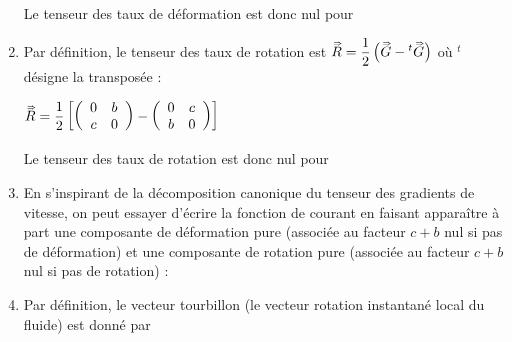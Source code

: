 \documentclass[10pt, a4paper]{article}
\begin{document}
\begin{enumerate}
\medskip
Le tenseur des taux de déformation est donc nul pour 

\item
Par définition, le tenseur des taux de rotation est $\accentset{\Rightarrow}{R} 
= \displaystyle \frac{1}{2} \left ( \accentset{\Rightarrow}{G} - {}^t \accentset{\Rightarrow}{G} \right )$
où ${}^t$ désigne la transposée :

\medskip
$
	\accentset{\Rightarrow}{R} = \displaystyle \frac{1}{2} \left [
	 \left (
		\begin{array}{cc}
			0 & b \\ 
			c & 0 
		\end{array}
	\right )
-
\left (
		\begin{array}{cc}
			0 & c \\ 
			b & 0 
		\end{array}
	\right )
\right ]
$
\dotfill


\medskip
Le tenseur des taux de rotation est donc nul pour 

\item
En s'inspirant de la décomposition canonique du tenseur des gradients de vitesse, on peut essayer d'écrire la fonction de courant en faisant apparaître à part une composante de déformation pure (associée au facteur $c+b$ nul si pas de déformation) et une composante de rotation pure (associée au facteur $c+b$ nul si pas de rotation) :

\dotfill
{}

\item
Par définition, le vecteur tourbillon (le vecteur rotation instantané local du fluide) est donné par 


\end{enumerate}
\end{document}
